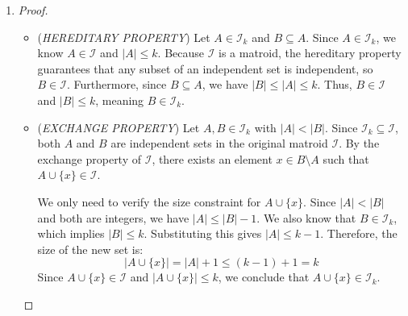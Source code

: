 \documentclass[12pt,a4paper]{article}
\makeatletter
\newtheorem*{solution}{Solution}
\theoremstyle{definition}
\renewenvironment{solution}[1][Solution]
{\par\pushQED{\qed}\normalfont\topsep6\p@\@plus6\p@\relax\trivlist
\item[\hskip\labelsep\bfseries#1\@addpunct{.}]\ignorespaces}{\popQED\endtrivlist\@endpefalse}
\makeatother
\begin{document}
\begin{enumerate}
\begin{solution}
\begin{enumerate}
\begin{proof}
                \begin{itemize}
                    \item (\emph{HEREDITARY PROPERTY})
                    Let $A \in \mathcal{I}_k$ and $B \subseteq A$. Since $A \in \mathcal{I}_k$, we know $A \in \mathcal{I}$ and $|A| \leq k$. Because $\mathcal{I}$ is a matroid, the hereditary property guarantees that any subset of an independent set is independent, so $B \in \mathcal{I}$. Furthermore, since $B \subseteq A$, we have $|B| \leq |A| \leq k$. Thus, $B \in \mathcal{I}$ and $|B| \leq k$, meaning $B \in \mathcal{I}_k$.
                    
                    \item (\emph{EXCHANGE PROPERTY})
                    Let $A, B \in \mathcal{I}_k$ with $|A| < |B|$. Since $\mathcal{I}_k \subseteq \mathcal{I}$, both $A$ and $B$ are independent sets in the original matroid $\mathcal{I}$. By the exchange property of $\mathcal{I}$, there exists an element $x \in B \setminus A$ such that $A \cup \{x\} \in \mathcal{I}$.
                    
                    We only need to verify the size constraint for $A \cup \{x\}$. Since $|A| < |B|$ and both are integers, we have $|A| \leq |B| - 1$. We also know that $B \in \mathcal{I}_k$, which implies $|B| \leq k$. 
                    Substituting this gives $|A| \leq k - 1$. 
                    Therefore, the size of the new set is:
                    $$ |A \cup \{x\}| = |A| + 1 \leq (k - 1) + 1 = k $$
                    Since $A \cup \{x\} \in \mathcal{I}$ and $|A \cup \{x\}| \leq k$, we conclude that $A \cup \{x\} \in \mathcal{I}_k$.
                \end{itemize}
            \end{proof}
        
        \end{enumerate}
    \end{solution}
\end{enumerate}
\end{document}
